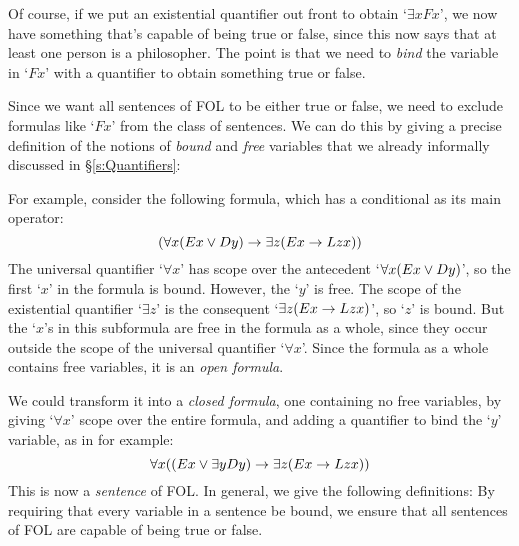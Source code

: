 Of course, if we put an existential quantifier out front to obtain `$\exists xFx$', we now have something that's capable of being true or false, since this now says that at least one person is a philosopher.  The point is that we need to \emph{bind} the variable in `$Fx$' with a quantifier to obtain something true or false.

Since we want all sentences of FOL to be either true or false, we need to exclude formulas like `$Fx$' from the class of sentences.  We can do this by giving a precise definition of the notions of \emph{bound} and \emph{free} variables that we already informally discussed in \S \ref{s:Quantifiers}:

For example, consider the following formula, which has a conditional as its main operator:
	$$(\forall x(Ex \vee Dy) \rightarrow \exists z(Ex \rightarrow Lzx))$$
The universal quantifier `$\forall x$' has scope over the antecedent `$\forall x (Ex \vee Dy)$', so the first `$x$' in the formula is  bound. However, the `$y$' is free. The scope of the existential quantifier `$\exists z$' is the consequent `$\exists z(Ex \rightarrow Lzx)$', so `$z$' is bound.  But the `$x$'s in this subformula are free in the formula as a whole, since they occur outside the scope of the universal quantifier `$\forall x$'.  Since the formula as a whole contains free variables, it is an \emph{open formula}.

We could transform it into a \emph{closed formula}, one containing no free variables, by giving `$\forall x$' scope over the entire formula, and adding a quantifier to bind the `$y$' variable, as in for example:
$$\forall x((Ex \vee \exists yDy) \rightarrow \exists z(Ex \rightarrow Lzx))$$
This is now a \emph{sentence} of FOL.  In general, we give the following definitions:
By requiring that every variable in a sentence be bound, we ensure that all sentences of FOL are capable of being true or false.


%
%
%
%
%


